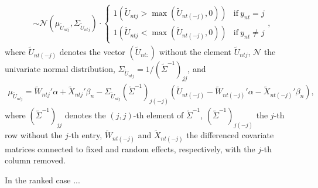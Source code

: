 \documentclass[article,shortnames]{jss}
\begin{document}
\begin{itemize}
\begin{align*}
  \sim \mathcal{N}(\mu_{\tilde{U}_{ntj}},\Sigma_{\tilde{U}_{ntj}}) \cdot \begin{cases}
  1(\tilde{U}_{ntj}>\max(\tilde{U}_{nt(-j)},0) ) & \text{if}~ y_{nt}=j\\
  1(\tilde{U}_{ntj}<\max(\tilde{U}_{nt(-j)},0) ) & \text{if}~ y_{nt}\neq j
  \end{cases},
  \end{align*}
  where $\tilde{U}_{nt(-j)}$ denotes the vector $(\tilde{U}_{nt:})$ without the element $\tilde{U}_{ntj}$, $\mathcal{N}$ the univariate normal distribution, $\Sigma_{\tilde{U}_{ntj}} = 1/(\tilde{\Sigma}^{-1})_{jj}$, and
  \begin{align*}
  \mu_{\tilde{U}_{ntj}} = \tilde{W}_{ntj}'\alpha + \tilde{X}_{ntj}'\beta_n - \Sigma_{\tilde{U}_{ntj}} (\tilde{\Sigma}^{-1})_{j(-j)}   (\tilde{U}_{nt(-j)} - \tilde{W}_{nt(-j)}'\alpha - \tilde{X}_{nt(-j)}' \beta_n ),
  \end{align*}
  where $(\tilde{\Sigma}^{-1})_{jj}$ denotes the $(j,j)$-th element of $\tilde{\Sigma}^{-1}$, $(\tilde{\Sigma}^{-1})_{j(-j)}$ the $j$-th row without the $j$-th entry, $\tilde{W}_{nt(-j)}$ and $\tilde{X}_{nt(-j)}$ the differenced covariate matrices connected to fixed and random effects, respectively, with the $j$-th column removed.

  In the ranked case ...


\end{itemize}
\end{document}
